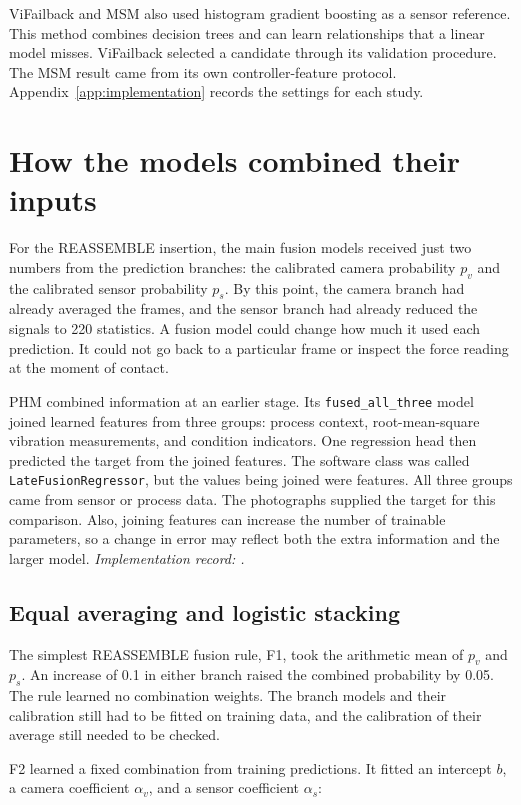 ViFailback and MSM also used histogram gradient boosting as a sensor reference. This method combines decision trees and can learn relationships that a linear model misses. ViFailback selected a candidate through its validation procedure. The MSM result came from its own controller-feature protocol. Appendix~\ref{app:implementation} records the settings for each study.

\section{How the models combined their inputs}

For the REASSEMBLE insertion, the main fusion models received just two numbers from the prediction branches: the calibrated camera probability \(p_v\) and the calibrated sensor probability \(p_s\). By this point, the camera branch had already averaged the frames, and the sensor branch had already reduced the signals to 220 statistics. A fusion model could change how much it used each prediction. It could not go back to a particular frame or inspect the force reading at the moment of contact.

PHM combined information at an earlier stage. Its \texttt{fused\_all\_three} model joined learned features from three groups: process context, root-mean-square vibration measurements, and condition indicators. One regression head then predicted the target from the joined features. The software class was called \texttt{LateFusionRegressor}, but the values being joined were features. All three groups came from sensor or process data. The photographs supplied the target for this comparison. Also, joining features can increase the number of trainable parameters, so a change in error may reflect both the extra information and the larger model. \textit{Implementation record: .}

\subsection{Equal averaging and logistic stacking}

The simplest REASSEMBLE fusion rule, F1, took the arithmetic mean of \(p_v\) and \(p_s\). An increase of 0.1 in either branch raised the combined probability by 0.05. The rule learned no combination weights. The branch models and their calibration still had to be fitted on training data, and the calibration of their average still needed to be checked.

F2 learned a fixed combination from training predictions. It fitted an intercept \(b\), a camera coefficient \(\alpha_v\), and a sensor coefficient \(\alpha_s\):

